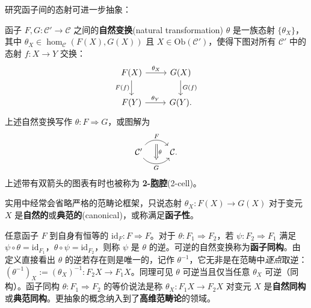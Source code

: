 研究函子间的态射可进一步抽象：
\begin{definition}
    函子 $F, G: \mathcal{C}' \to \mathcal{C}$ 之间的\textbf{自然变换}(natural transformation) $\theta$ 是一族态射 $\{\theta_X\}$，其中 $\theta_X \in \hom_{\mathcal{C}}(F(X), G(X))$ 且 $X \in \mathrm{Ob}(\mathcal{C}')$，使得下图对所有 $\mathcal{C}'$ 中的态射 $f: X \to Y$ 交换：
    \begin{equation}\begin{tikzcd}
        F(X) \arrow[r, "\theta_X"] \ar[d, "F(f)"'] & G(X) \arrow[d, "G(f)"] \\
        F(Y) \arrow[r, "\theta_Y"] & G(Y) .
    \end{tikzcd}\end{equation}
    上述自然变换写作 $\theta: F \Rightarrow G$，或图解为
    \[ \begin{tikzcd}
        \mathcal{C}' \arrow[bend left=50, r, "F", ""' name=U] \arrow[bend right=50, r, "G"', "" name=D] & \arrow[Rightarrow, to path=(U) -- (D) \tikztonodes, "\theta"] \mathcal{C}.
    \end{tikzcd} \]
    上述带有双箭头的图表有时也被称为 \textbf{2-胞腔}(2-cell)。
\end{definition}

实用中经常会省略严格的范畴论框架，只说态射 $\theta_X: F(X) \to G(X)$ 对于变元 $X$ 是\textbf{自然的}或\textbf{典范的}(canonical)，或称满足\textbf{函子性}。

任意函子 $F$ 到自身有恒等的 $\mathrm{id}_F : F \Rightarrow F$。对于 $\theta: F_1 \Rightarrow F_2$，若 $\psi: F_2 \Rightarrow F_1$ 满足 $\psi \circ \theta = \mathrm{id}_{F_1}$，$\theta \circ \psi = \mathrm{id}_{F_2}$，则称 $\psi$ 是 $\theta$ 的逆。可逆的自然变换称为\textbf{函子同构}。由定义直接看出 $\theta$ 的逆若存在则是唯一的，记作 $\theta^{-1}$，它无非是在范畴中\textit{逐点}取逆：$(\theta^{-1})_X := (\theta_X)^{-1}: F_2 X \to F_1 X$。同理可见 $\theta$ 可逆当且仅当任意 $\theta_X$ 可逆（同构）。函子同构 $\theta: F_1 \Rightarrow F_2$ 的等价说法是称 $\theta_X: F_1 X \to F_2 X$ 对变元 $X$ 是\textbf{自然同构}或\textbf{典范同构}。更抽象的概念纳入到了\textbf{高维范畴论}的领域。
